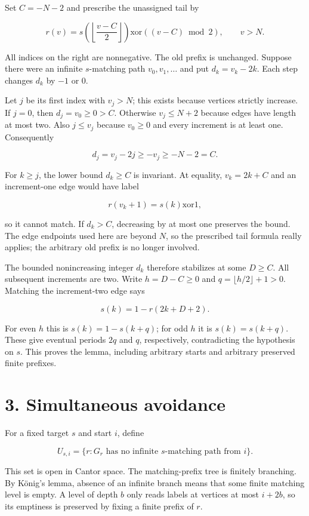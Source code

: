 \documentclass[
  11pt,
]{article}
\begin{document}
Set \(C=-N-2\) and prescribe the unassigned tail by

\[r(v)=s\!\left(\left\lfloor\frac{v-C}{2}\right\rfloor\right)
\mathbin{\mathrm{xor}}((v-C)\bmod2),\qquad v>N.\]

All indices on the right are nonnegative. The old prefix is unchanged.
Suppose there were an infinite \(s\)-matching path \(v_0,v_1,\ldots\)
and put \(d_k=v_k-2k\). Each step changes \(d_k\) by \(-1\) or 0.

Let \(j\) be its first index with \(v_j>N\); this exists because
vertices strictly increase. If \(j=0\), then \(d_j=v_0\ge0>C\).
Otherwise \(v_j\le N+2\) because edges have length at most two. Also
\(j\le v_j\) because \(v_0\ge0\) and every increment is at least one.
Consequently

\[d_j=v_j-2j\ge-v_j\ge-N-2=C.\]

For \(k\ge j\), the lower bound \(d_k\ge C\) is invariant. At equality,
\(v_k=2k+C\) and an increment-one edge would have label

\[r(v_k+1)=s(k)\mathbin{\mathrm{xor}}1,\]

so it cannot match. If \(d_k>C\), decreasing by at most one preserves
the bound. The edge endpoints used here are beyond \(N\), so the
prescribed tail formula really applies; the arbitrary old prefix is no
longer involved.

The bounded nonincreasing integer \(d_k\) therefore stabilizes at some
\(D\ge C\). All subsequent increments are two. Write \(h=D-C\ge0\) and
\(q=\lfloor h/2\rfloor+1>0\). Matching the increment-two edge says

\[s(k)=1-r(2k+D+2).\]

For even \(h\) this is \(s(k)=1-s(k+q)\); for odd \(h\) it is
\(s(k)=s(k+q)\). These give eventual periods \(2q\) and \(q\),
respectively, contradicting the hypothesis on \(s\). This proves the
lemma, including arbitrary starts and arbitrary preserved finite
prefixes.

\section{3. Simultaneous avoidance}\label{simultaneous-avoidance}

For a fixed target \(s\) and start \(i\), define

\[U_{s,i}=\{r:G_r\text{ has no infinite }s\text{-matching path from }i\}.\]

This set is open in Cantor space. The matching-prefix tree is finitely
branching. By König's lemma, absence of an infinite branch means that
some finite matching level is empty. A level of depth \(b\) only reads
labels at vertices at most \(i+2b\), so its emptiness is preserved by
fixing a finite prefix of \(r\).
\end{document}
